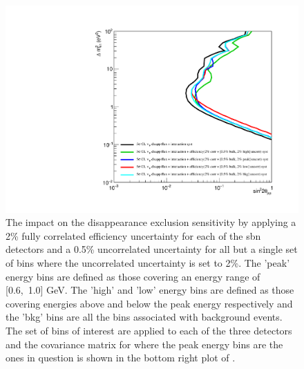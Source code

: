 \begin{figure}[!h]
    \centering
    \includegraphics[width = \largefigwidth]{figures-chap6/exclusion_contours/efficiency_systematics/numu_disapp_2pct_cor_05pct_bulk_2pct_X_uncor.pdf}
    \caption[\numu disapp with poorly constrained efficiency systematic for a set of bins.]{The impact on the \numu disappearance exclusion sensitivity by applying a 2\% fully correlated efficiency uncertainty for each of the \gls{sbn} detectors and a 0.5\% uncorrelated uncertainty for all but a single set of bins where the uncorrelated uncertainty is set to 2\%. The 'peak' energy bins are defined as those covering an energy range of [0.6,~1.0] GeV. The 'high' and 'low' energy bins are defined as those covering energies above and below the peak energy respectively and the 'bkg' bins are all the bins associated with background events. The set of bins of interest are applied to each of the three detectors and the covariance matrix for where the peak energy bins are the ones in question is shown in the bottom right plot of .}
    \label{fig:numu_bulk_uncorr}
\end{figure}







%
